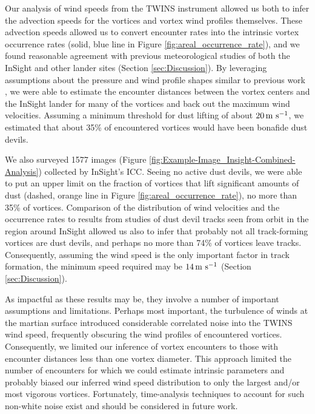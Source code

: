 \documentclass[linenumbers,trackchanges]{aastex63}
\begin{document}
Our analysis of wind speeds from the TWINS instrument allowed us both to infer the advection speeds for the vortices and vortex wind profiles themselves. These advection speeds allowed us to convert encounter rates into the intrinsic vortex occurrence rates (solid, blue line in Figure \ref{fig:areal_occurrence_rate}), and we found reasonable agreement with previous meteorological studies of both the InSight and other lander sites (Section \ref{sec:Discussion}). By leveraging assumptions about the pressure and wind profile shapes similar to previous work \citep{2016Icar..271..326L}, we were able to estimate the encounter distances between the vortex centers and the InSight lander for many of the vortices and back out the maximum wind velocities. Assuming a minimum threshold for dust lifting of about $20\,{\rm m\ s^{-1}}$, we estimated that about 35\% of encountered vortices would have been bonafide dust devils. 

We also surveyed 1577 images (Figure \ref{fig:Example-Image_Insight-Combined-Analysis}) collected by InSight's ICC. Seeing no active dust devils, we were able to put an upper limit on the fraction of vortices that lift significant amounts of dust (dashed, orange line in Figure \ref{fig:areal_occurrence_rate}), no more than 35\% of vortices. Comparison of the distribution of wind velocities and the occurrence rates to results from studies of dust devil tracks seen from orbit in the region around InSight \citep{2020GeoRL..4787234P} allowed us also to infer that probably not all track-forming vortices are dust devils, and perhaps no more than 74\% of vortices leave tracks. Consequently, assuming the  wind speed is the only important factor in track formation, the minimum speed required may be $14\,{\rm m\ s^{-1}}$ (Section \ref{sec:Discussion}). 

As impactful as these results may be, they involve a number of important assumptions and limitations. Perhaps most important, the turbulence of winds at the martian surface introduced considerable correlated noise \citep[\emph{cf.}][]{2018RemS...10...65J} into the TWINS wind speed, frequently obscuring the wind profiles of encountered vortices. Consequently, we limited our inference of vortex encounters to those with encounter distances less than one vortex diameter. This approach limited the number of encounters for which we could estimate intrinsic parameters and probably biased our inferred wind speed distribution to only the largest and/or most vigorous vortices. Fortunately, time-analysis techniques to account for such non-white noise exist \citep{hodlr} and should be considered in future work. 
\end{document}
